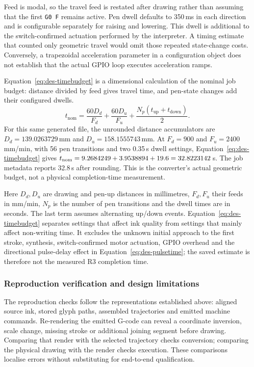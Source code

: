 Feed is modal, so the travel feed is restated after drawing rather than assuming that the first \texttt{G0 F} remains active. Pen dwell defaults to 350\,ms in each direction and is configurable separately for raising and lowering. This dwell is additional to the switch-confirmed actuation performed by the interpreter. A timing estimate that counted only geometric travel would omit those repeated state-change costs. Conversely, a trapezoidal acceleration parameter in a configuration object does not establish that the actual GPIO loop executes acceleration ramps.

Equation~\ref{eq:des-timebudget} is a dimensional calculation of the nominal job budget: distance divided by feed gives travel time, and pen-state changes add their configured dwells.
\begin{equation}
t_{\mathrm{nom}}=\frac{60D_d}{F_d}+\frac{60D_u}{F_u}
+\frac{N_p(t_{\mathrm{up}}+t_{\mathrm{down}})}{2}.
\label{eq:des-timebudget}
\end{equation}
For this same generated file, the unrounded distance accumulators are $D_d=139.0263729$\,mm and $D_u=158.1555743$\,mm. At $F_d=900$ and $F_u=2400$\,mm/min, with 56 pen transitions and two 0.35\,s dwell settings, Equation~\ref{eq:des-timebudget} gives $t_{\rm nom}=9.2684249+3.9538894+19.6=32.8223142$\,s. The job metadata reports 32.8\,s after rounding. This is the converter's actual geometric budget, not a physical completion-time measurement.

Here $D_d,D_u$ are drawing and pen-up distances in millimetres, $F_d,F_u$ their feeds in mm/min, $N_p$ is the number of pen transitions and the dwell times are in seconds. The last term assumes alternating up/down events. Equation~\ref{eq:des-timebudget} separates settings that affect ink quality from settings that mainly affect non-writing time. It excludes the unknown initial approach to the first stroke, synthesis, switch-confirmed motor actuation, GPIO overhead and the directional pulse-delay effect in Equation~\ref{eq:des-pulsetime}; the saved estimate is therefore not the measured R3 completion time.

\subsubsection{Reproduction verification and design limitations}
The reproduction checks follow the representations established above: aligned source ink, stored glyph paths, assembled trajectories and emitted machine commands. Re-rendering the emitted G-code can reveal a coordinate inversion, scale change, missing stroke or additional joining segment before drawing. Comparing that render with the selected trajectory checks conversion; comparing the physical drawing with the render checks execution. These comparisons localise errors without substituting for end-to-end qualification.


